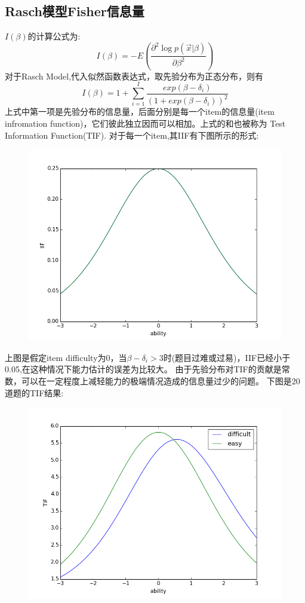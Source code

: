 \documentclass[12pt]{article}
\begin{document}
\subsection{Rasch模型Fisher信息量}\label{A4}
$I(\beta)$的计算公式为:
\begin{equation}
I(\beta)=-E(\frac{\partial^2 \log p(\vec{x}|\beta)}{\partial \beta^2})
\end{equation}
对于Rasch Model,代入似然函数表达式，取先验分布为正态分布，则有
\begin{equation}
I(\beta)=1+\sum_{i=1}^I \frac{exp(\beta-\delta_i)}{(1+exp(\beta-\delta_i))^2}
\end{equation}
上式中第一项是先验分布的信息量，后面分别是每一个item的信息量(item infromation function)，它们彼此独立因而可以相加。上式的和也被称为
Test Information Function(TIF).
对于每一个item,其IIF有下图所示的形式:
\begin{figure}[!ht]
\includegraphics[width=\linewidth]{IIF.png}
\end{figure}

上图是假定item difficulty为0，当$\beta-\delta_i>3$时(题目过难或过易)，IIF已经小于0.05,在这种情况下能力估计的误差为比较大。
由于先验分布对TIF的贡献是常数，可以在一定程度上减轻能力的极端情况造成的信息量过少的问题。
下图是20道题的TIF结果:
\begin{figure}[!ht]
\includegraphics[width=\linewidth]{TIF.png}
\end{figure}
\end{document}
